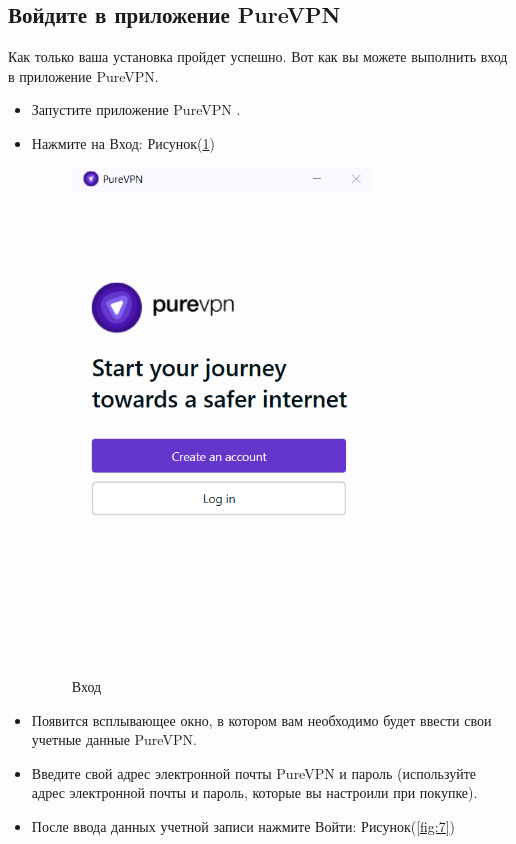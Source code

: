 \subsection{Войдите в приложение PureVPN} 
Как только ваша установка пройдет успешно. Вот как вы можете выполнить вход в приложение PureVPN.
\begin{itemize}
\item Запустите приложение PureVPN .
\item Нажмите на Вход:  Рисунок(\ref{fig:6})
\begin{figure}[H]
\includegraphics[width=8cm]{5.png}
\centering
\caption{Вход}
\label{fig:6}
\end{figure}
\item Появится всплывающее окно, в котором вам необходимо будет ввести свои учетные данные PureVPN.
\item Введите свой адрес электронной почты PureVPN и пароль (используйте адрес электронной почты и пароль, которые вы настроили при покупке).
\item После ввода данных учетной записи нажмите Войти:  Рисунок(\ref{fig:7})
\begin{figure}[H]

\end{figure}
\end{itemize}
